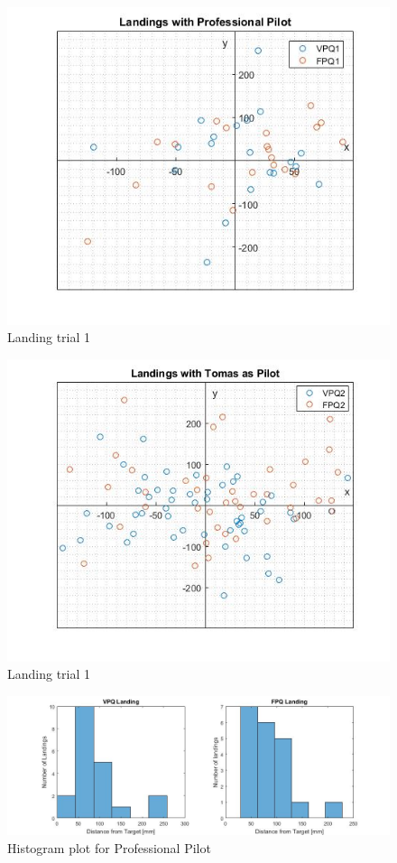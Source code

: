 \begin{figure}[H]
    \centering
    \includegraphics[width = 1\textwidth]{VAPIQ-PICTURES/bothProff}
    \caption{Landing trial 1}
    \label{fig:landsetup2}
\end{figure}

\begin{figure}[H]
    \centering
    \includegraphics[width = 1\textwidth]{VAPIQ-PICTURES/bothTomas}
    \caption{Landing trial 1 }
    \label{fig:landsetup3}
\end{figure}

\begin{figure}[H]
    \centering
    \includegraphics[width = 1\textwidth]{VAPIQ-PICTURES/histoproff}
    \caption{Histogram plot for Professional Pilot}
    \label{fig:landsetup4}
\end{figure}

